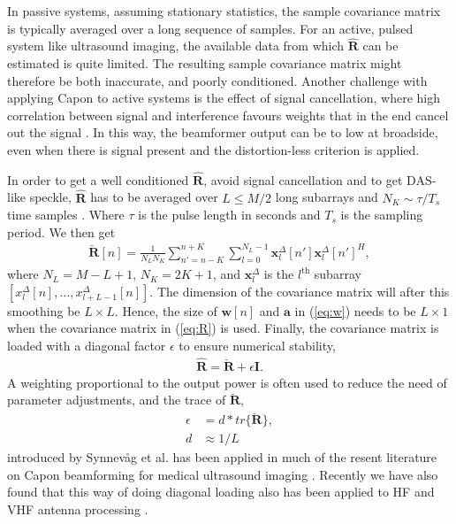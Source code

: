 \documentclass[journal]{IEEEtran}
\newcommand{\mat}[1]{\mathbf{#1}}
\renewcommand{\vec}[1]{\mathbf{#1}}
\begin{document}
In passive systems, assuming stationary statistics, the sample covariance matrix is typically averaged over a long sequence of samples\cite{Krima}. For an active, pulsed system like ultrasound imaging, the available data from which $\mat{\hat{R}}$ can be estimated is quite limited. The resulting sample covariance matrix might therefore be both inaccurate, and poorly conditioned. Another challenge with applying Capon to active systems is the effect of signal cancellation, where high correlation between signal and interference favours weights that in the end cancel out the signal \cite{Reddy1987}. In this way, the beamformer output can be to low at broadside, even when there is signal present and the distortion-less criterion is applied. 

In order to get a well conditioned $\mat{\hat{R}}$, avoid signal cancellation and to get DAS-like speckle, $\mat{\hat{R}}$ has to be averaged over $L\le M/2$ long subarrays and $N_K \sim \tau/T_s$ time samples \cite{Synnevag2007, Synnevag2007a}. Where $\tau$ is the pulse length in seconds and $T_s$ is the sampling period. We then get
\begin{align}
\mat{\breve{R}}[n] = \frac{1}{N_LN_K}\sum_{n'=n-K}^{n+K} \sum_{l=0}^{N_L-1} \vec{x}_l^{\Delta}[n']\vec{x}_l^{\Delta}[n']^H,\label{eq:R}
\end{align}
where $N_L = M-L+1$, $N_K = 2K + 1$, and $\vec{x}_l^{\Delta}$ is the $l^\text{th}$ subarray $[x_l^{\Delta}[n], \dotso, x_{l+L-1}^{\Delta}[n]]$. The dimension of the covariance matrix will after this smoothing be $L \times L$. Hence, the size of $\vec{w}[n]$ and $\vec{a}$ in (\ref{eq:w}) needs to be $L \times 1$ when the covariance matrix in (\ref{eq:R}) is used.
Finally, the covariance matrix is loaded with a diagonal factor $\epsilon$ to ensure numerical stability, 
\begin{align}
\mat{\hat{R}} = \mat{\breve{R}} + \epsilon\mat{I}.
\end{align}
A weighting proportional to the output power is often used to reduce the need of parameter adjustments, and the trace of $\mat{\breve{R}}$, 
\begin{align}\label{eq:diag}
\epsilon &= d*tr\{\mat{\breve{R}}\}, \\
d &\approx 1/L
\end{align}
introduced by Synnev\aa{}g et al. \cite{Synnevag2007} has been applied in much of the resent literature on Capon beamforming for medical ultrasound imaging \cite{Nilsen2009, Wang2009, Mehdizadeh2012}. Recently we have also found that this way of doing diagonal loading also has been applied to HF and VHF antenna processing \cite{Featherstone1997}.
\end{document}
